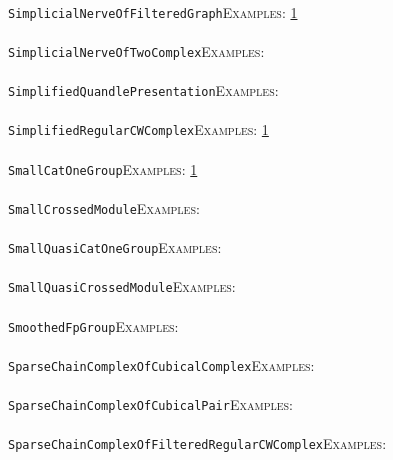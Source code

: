 \documentclass[a4paper,11pt]{report}
\begin{document}
{{ \\
 \texttt{SimplicialNerveOfFilteredGraph}{\nobreakspace}{\nobreakspace}{\nobreakspace}{\nobreakspace}\textsc{Examples:} \href{../www/SideLinks/About/aboutPersistent.html} {1}{\nobreakspace} \\
 \\
 \texttt{SimplicialNerveOfTwoComplex}{\nobreakspace}{\nobreakspace}{\nobreakspace}{\nobreakspace}\textsc{Examples:} \\
 \\
 \texttt{SimplifiedQuandlePresentation}{\nobreakspace}{\nobreakspace}{\nobreakspace}{\nobreakspace}\textsc{Examples:} \\
 \\
 \texttt{SimplifiedRegularCWComplex}{\nobreakspace}{\nobreakspace}{\nobreakspace}{\nobreakspace}\textsc{Examples:} \href{../www/SideLinks/About/aboutPeripheral.html} {1}{\nobreakspace} \\
 \\
 \texttt{SmallCatOneGroup}{\nobreakspace}{\nobreakspace}{\nobreakspace}{\nobreakspace}\textsc{Examples:} \href{../www/SideLinks/About/aboutquasi.html} {1}{\nobreakspace} \\
 \\
 \texttt{SmallCrossedModule}{\nobreakspace}{\nobreakspace}{\nobreakspace}{\nobreakspace}\textsc{Examples:} \\
 \\
 \texttt{SmallQuasiCatOneGroup}{\nobreakspace}{\nobreakspace}{\nobreakspace}{\nobreakspace}\textsc{Examples:} \\
 \\
 \texttt{SmallQuasiCrossedModule}{\nobreakspace}{\nobreakspace}{\nobreakspace}{\nobreakspace}\textsc{Examples:} \\
 \\
 \texttt{SmoothedFpGroup}{\nobreakspace}{\nobreakspace}{\nobreakspace}{\nobreakspace}\textsc{Examples:} \\
 \\
 \texttt{SparseChainComplexOfCubicalComplex}{\nobreakspace}{\nobreakspace}{\nobreakspace}{\nobreakspace}\textsc{Examples:} \\
 \\
 \texttt{SparseChainComplexOfCubicalPair}{\nobreakspace}{\nobreakspace}{\nobreakspace}{\nobreakspace}\textsc{Examples:} \\
 \\
 \texttt{SparseChainComplexOfFilteredRegularCWComplex}{\nobreakspace}{\nobreakspace}{\nobreakspace}{\nobreakspace}\textsc{Examples:} \\
}}
\end{document}

